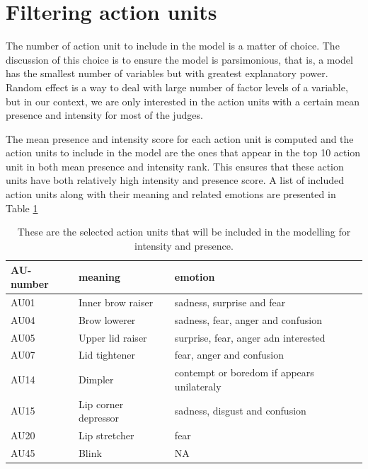 \documentclass{monashthesis}
\begin{document}
\let\cleardoublepage\clearpage

\hypertarget{filtering-action-units}{%
\section{Filtering action units}\label{filtering-action-units}}

The number of action unit to include in the model is a matter of choice. The discussion of this choice is to ensure the model is parsimonious, that is, a model has the smallest number of variables but with greatest explanatory power. Random effect is a way to deal with large number of factor levels of a variable, but in our context, we are only interested in the action units with a certain mean presence and intensity for most of the judges.

The mean presence and intensity score for each action unit is computed and the action units to include in the model are the ones that appear in the top 10 action unit in both mean presence and intensity rank. This ensures that these action units have both relatively high intensity and presence score. A list of included action units along with their meaning and related emotions are presented in Table \ref{tab:au-included}

\begin{table}[ht]
\begin{center}
\caption{\label{tab:au-included} These are the selected action units that will be included in the modelling for intensity and presence.}
\begin{tabular}{lll}
\toprule
AU-number & meaning & emotion \\
\midrule
AU01 & Inner brow raiser & sadness, surprise and fear \\
AU04 & Brow lowerer & sadness, fear, anger and confusion \\
AU05 & Upper lid raiser & surprise, fear, anger adn interested \\
AU07 & Lid tightener & fear, anger and confusion \\
AU14 & Dimpler & contempt or boredom if appears unilateraly \\
AU15 & Lip corner depressor & sadness, disgust and confusion \\
AU20 & Lip stretcher & fear \\
AU45 & Blink & NA \\
\bottomrule
\end{tabular}
\end{center}
\end{table}
\end{document}
